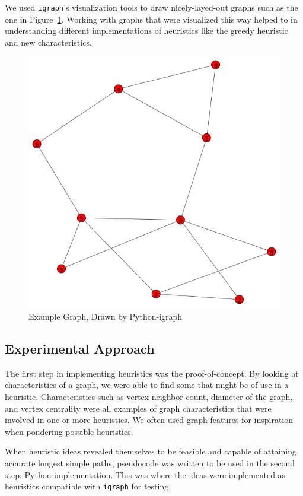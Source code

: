\documentclass[twocolumn,showpacs,%
  nofootinbib,aps,superscriptaddress,%
  eqsecnum,prd,notitlepage,showkeys,11pt]{article}
\begin{document}
We used \texttt{igraph}'s visualization tools to draw nicely-layed-out graphs such as the one in Figure~\ref{fig:ExampleGraph}.  Working with graphs that were visualized this way helped to in understanding different implementations of heuristics like the greedy heuristic and new characteristics.

\begin{figure}
    \centering
    \includegraphics[width=0.8\linewidth]{examplegraph.png}
    \caption{Example Graph, Drawn by Python-igraph}
    \label{fig:ExampleGraph}
\end{figure}

\subsection{Experimental Approach}

The first step in implementing heuristics was the proof-of-concept. By looking at characteristics of a graph, we were able to find some that might be of use in a heuristic. Characteristics such as vertex neighbor count, diameter of the graph, and vertex centrality were all examples of graph characteristics that were involved in one or more heuristics. We often used graph features for inspiration when pondering possible heuristics.

When heuristic ideas revealed themselves to be feasible and capable of attaining accurate longest simple paths, pseudocode was written to be used in the second step: Python implementation. This was where the ideas were implemented as heuristics compatible with \texttt{igraph} for testing.
\end{document}
